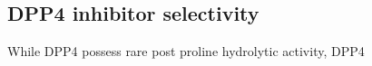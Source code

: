 \subsection{DPP4 inhibitor selectivity}
While DPP4 possess rare post proline hydrolytic activity, DPP4
